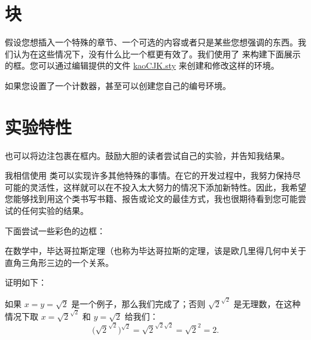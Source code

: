 \section[块]{块
  }

  假设您想插入一个特殊的章节、一个可选的内容或者只是某些您想强调的东西。我们认为在这些情况下，没有什么比一个框更有效了。我们使用了  来构建下面展示的框。您可以通过编辑提供的文件 \href{kaoCJK.sty}{kaoCJK.sty} 来创建和修改这样的环境。

\begin{kaobox}[frametitle=Box的标题]
	\zhlipsum[2]
\end{kaobox}

如果您设置了一个计数器，甚至可以创建您自己的编号环境。

\begin{kaocounter}
	\zhlipsum[1]
\end{kaocounter}

\section{实验特性}

也可以将边注包裹在框内。鼓励大胆的读者尝试自己的实验，并告知我结果。


我相信使用  类可以实现许多其他特殊的事情。在它的开发过程中，我努力保持尽可能的灵活性，这样就可以在不投入太大努力的情况下添加新特性。因此，我希望您能够找到用这个类书写书籍、报告或论文的最佳方式，我也很期待看到您可能尝试的任何实验的结果。

下面尝试一些彩色的边框：

在数学中，毕达哥拉斯定理（也称为毕达哥拉斯的定理，该是欧几里得几何中关于直角三角形三边的一个关系。


证明如下：

如果 $x=y=\sqrt{2}$ 是一个例子，那么我们完成了；否则 $\sqrt{2}^{\sqrt{2}}$ 是无理数，在这种情况下取 $x=\sqrt{2}^{\sqrt{2}}$ 和 $y=\sqrt{2}$ 给我们：
\[\bigg(\sqrt{2}^{\sqrt{2}}\bigg)^{\sqrt{2}}=\sqrt{2}^{\sqrt{2}\sqrt{2}}=\sqrt{2}^{2}=2.\]

